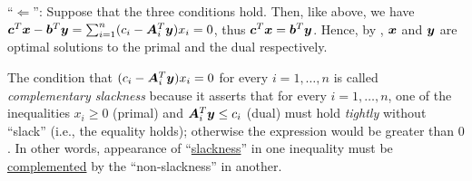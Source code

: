 \begin{enumerate}
\begin{pf}
``\(\Leftarrow\)'': Suppose that the three conditions hold. Then, like above,
we have
\(\bm{c}^{T}\bm{x}-\bm{b}^{T}\bm{y}=\sum_{i=1}^{n}(c_i-\bm{A}_i^{T}\bm{y})x_i
=0\), thus \(\bm{c}^{T}\bm{x}=\bm{b}^{T}\bm{y}\). Hence, by
, \(\bm{x}\) and \(\bm{y}\) are optimal
solutions to the primal and the dual respectively.
\end{pf}

\begin{note}
The condition that \((c_i-\bm{A}_i^{T}\bm{y})x_i=0\) for every
\(i=1,\dotsc,n\) is called \emph{complementary slackness} because it asserts
that for every \(i=1,\dotsc,n\), one of the inequalities \(x_i\ge 0\) (primal)
and \(\bm{A}_i^{T}\bm{y}\le c_i\) (dual) must hold \emph{tightly} without
``slack'' (i.e., the equality holds); otherwise the expression would be greater
than \(0\). In other words, appearance of ``\underline{slackness}'' in one
inequality must be \underline{complemented} by the ``non-slackness'' in
another.
\end{note}
\end{enumerate}
